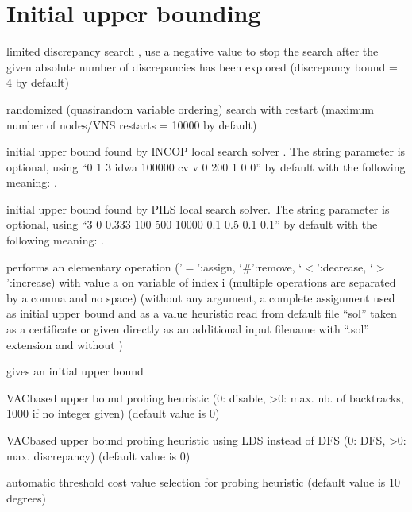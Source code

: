 \documentclass[letterpaper,10pt,openany,oneside,english]{sphinxmanual}
\begin{document}
\section{Initial upper bounding}
\label{\detokenize{userdoc:initial-upper-bounding}}\begin{description}
\sphinxAtStartPar
limited discrepancy search , use a negative value to stop the search after the given absolute number of discrepancies has been explored (discrepancy bound = 4 by default)

\sphinxAtStartPar
randomized (quasi\sphinxhyphen{}random variable ordering) search with restart (maximum number of nodes/VNS restarts = 10000 by default)

\sphinxAtStartPar
initial upper bound found by INCOP local search
solver . The string parameter is optional,
using “0 1 3 idwa 100000 cv v 0 200 1 0 0” by default with the
following meaning:
.

\sphinxAtStartPar
initial upper bound found by PILS local search
solver. The string parameter is optional,
using “3 0 0.333 100 500 10000 0.1 0.5 0.1 0.1” by default with the
following meaning:
.

\sphinxAtStartPar
performs an elementary operation (’\(=\)’:assign,
‘\(\#\)’:remove, ‘\(<\)’:decrease, ‘\(>\)’:increase) with
value a on variable of index i (multiple operations are separated by a
comma and no space) (without any
argument, a complete assignment \textendash{} used as initial upper bound and
as a value heuristic \textendash{} read from default file “sol” taken as a
certificate or given directly as an additional input
filename with “.sol” extension and without )

\sphinxAtStartPar
gives an initial upper bound

\sphinxAtStartPar
VAC\sphinxhyphen{}based upper bound probing heuristic (0: disable, \textgreater{}0: max. nb. of
backtracks, 1000 if no integer given) (default value is 0)

\sphinxAtStartPar
VAC\sphinxhyphen{}based upper bound probing heuristic using LDS instead of DFS
(0: DFS, \textgreater{}0: max. discrepancy) (default value is 0)

\sphinxAtStartPar
automatic threshold cost value selection for probing heuristic
(default value is 10 degrees)

\end{description}
\end{document}
